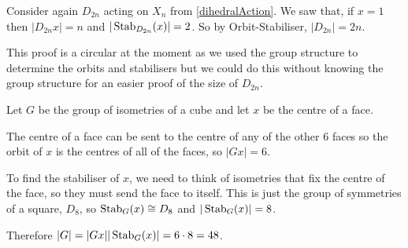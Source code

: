 \documentclass[../main.tex]{subfiles}
\begin{document}
\begin{example}
  Consider again $D_{2n}$ acting on $X_n$ from \cref{dihedralAction}.
  We saw that, if $x = 1$ then $|D_{2n}x| = n$ and $|\operatorname{Stab}_{D_{2n}}(x)| = 2$.
  So by Orbit-Stabiliser, $|D_{2n}| = 2n$.

  This proof is a circular at the moment as we used the group structure to determine the orbits and stabilisers but we could do this without knowing the group structure for an easier proof of the size of $D_{2n}$.
\end{example}
\begin{example}
  Let $G$ be the group of isometries of a cube and let $x$ be the centre of a face.

  The centre of a face can be sent to the centre of any of the other $6$ faces so the orbit of $x$ is the centres of all of the faces, so $|Gx| = 6$.

  To find the stabiliser of $x$, we need to think of isometries that fix the centre of the face, so they must send the face to itself.
  This is just the group of symmetries of a square, $D_{8}$, so $\operatorname{Stab}_G(x) \cong D_8$ and $|\operatorname{Stab}_G(x)| = 8$.

  Therefore $|G| = |Gx||\operatorname{Stab}_G(x)| = 6 \cdot 8 = 48$.
\end{example}
\end{document}

